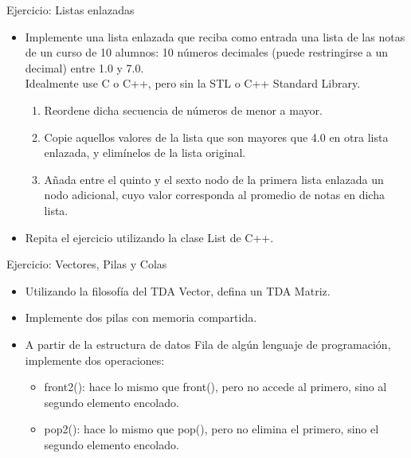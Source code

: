 \documentclass{beamer} %
\begin{document}
\begin{frame}{Ejercicio: Listas enlazadas}
    \begin{itemize}
        \item Implemente una lista enlazada que reciba como entrada una lista de las notas de un curso de 10 alumnos: 10 números decimales (puede restringirse a un decimal) entre 1.0 y 7.0.\\
        \small{Idealmente use C o C++, pero sin la STL o C++ Standard Library.}
        \begin{enumerate}
            \item Reordene dicha secuencia de números de menor a mayor.
            \item Copie aquellos valores de la lista que son mayores que 4.0 en otra lista enlazada, y elimínelos de la lista original.
            \item Añada entre el quinto y el sexto nodo de la primera lista enlazada un nodo adicional, cuyo valor corresponda al promedio de notas en dicha lista.
        \end{enumerate}
        \item Repita el ejercicio utilizando la clase List de C++.
    \end{itemize}
\end{frame}

\begin{frame}{Ejercicio: Vectores, Pilas y Colas}
    \begin{itemize}
        \item Utilizando la filosofía del TDA Vector, defina un TDA Matriz.
        \item Implemente dos pilas con memoria compartida.
        \item A partir de la estructura de datos Fila de algún lenguaje de programación, implemente dos operaciones:
        \begin{itemize}
            \item front2(): hace lo mismo que front(), pero no accede al primero, sino al segundo elemento encolado.
            \item pop2(): hace lo mismo que pop(), pero no elimina el primero, sino el segundo elemento encolado.
        \end{itemize}
    \end{itemize}
\end{frame}

\end{document}
